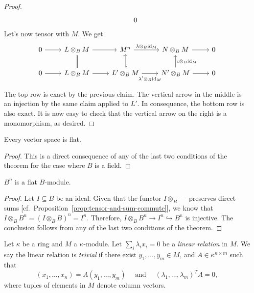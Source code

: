\begin{proof}
$$\begin{tikzcd}
                &0
        \end{tikzcd}
    $$
    Let's now tensor with $M$. We get
    $$
        \begin{tikzcd}
            0
                    \arrow[r]
                &L\otimes_BM
                    \arrow[r]
                &M^n
                    \arrow[r,"\lambda\otimes_B\id_M"]
                &N\otimes_BM
                    \arrow[r]
                &0\\
            0
                    \arrow[r]
                &L\otimes_BM
                    \arrow[r]
                    \arrow[u,equal]
                &L'\otimes_BM
                    \arrow[u,hook']
                    \arrow[r,"\vphantom{\big(}\lambda'\otimes_B\id_M"']
                &N'\otimes_BM
                    \arrow[u,"\iota\otimes_B\id_M"']
                    \arrow[r]
                &0
        \end{tikzcd}
    $$
    The top row is exact by the previous claim. The vertical arrow in the middle is an injection by the same claim applied to $L'$. In consequence, the bottom row is also exact. It is now easy to check that the vertical arrow on the right is a monomorphism, as desired.
\end{proof}

\begin{cor}\label{cor:vect-spaces-are-flat}
    Every vector space is flat.
\end{cor}

\begin{proof}
    This is a direct consequence of any of the last two conditions of the theorem for the case where $B$ is a field.
\end{proof}

\begin{cor}\label{cor:B^n-is-flat}
    $B^n$ is a flat\/ $B$-module.
\end{cor}

\begin{proof}
    Let $I\subseteq B$ be an ideal. Given that the functor $I\otimes_B-$ preserves direct sums [cf.~Proposition~\ref{prop:tensor-and-sum-commute}], we know that $I\otimes_BB^n=(I\otimes_BB)^n=I^n$. Therefore, $I\otimes_BB^n\to I^n\hookrightarrow B^n$ is injective. The conclusion follows from any of the last two conditions of the theorem.
\end{proof}

\begin{defn}
    Let $\kappa$ be a ring and $M$ a $\kappa$-module. Let $\sum_i\lambda_i x_i=0$ be a \textsl{linear relation} in $M$. We say the linear relation is \textsl{trivial} if there exist $y_1,\dots,y_m\in M$, and $A\in\kappa^{n\times m}$ such that
    $$
        (x_1,\dots,x_n) = A(y_1,\dots,y_m)
            \quad\text{ and }\quad 
            (\lambda_1,\dots,\lambda_m)^TA=0,
    $$
    where tuples of elements in $M$ denote column vectors.
\end{defn}


